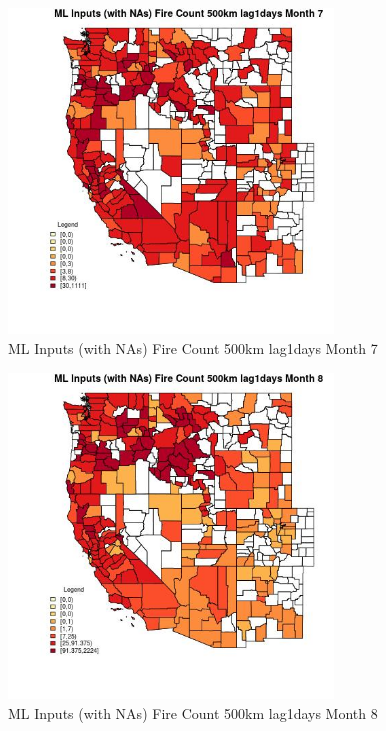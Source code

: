 \clearpage 

\begin{figure} 
\centering  
\includegraphics[width=0.77\textwidth]{Code_Outputs/Report_ML_input_PM25_Step4_part_e_de_duplicated_aves_compiled_2019-05-21wNAs_CountyFire_Count_500km_lag1daysmedianMonth7.jpg} 
\caption{\label{fig:Report_ML_input_PM25_Step4_part_e_de_duplicated_aves_compiled_2019-05-21wNAsCountyFire_Count_500km_lag1daysmedianMonth7}ML Inputs (with NAs) Fire Count 500km lag1days Month 7} 
\end{figure} 
 

\begin{figure} 
\centering  
\includegraphics[width=0.77\textwidth]{Code_Outputs/Report_ML_input_PM25_Step4_part_e_de_duplicated_aves_compiled_2019-05-21wNAs_CountyFire_Count_500km_lag1daysmedianMonth8.jpg} 
\caption{\label{fig:Report_ML_input_PM25_Step4_part_e_de_duplicated_aves_compiled_2019-05-21wNAsCountyFire_Count_500km_lag1daysmedianMonth8}ML Inputs (with NAs) Fire Count 500km lag1days Month 8} 
\end{figure} 
 

